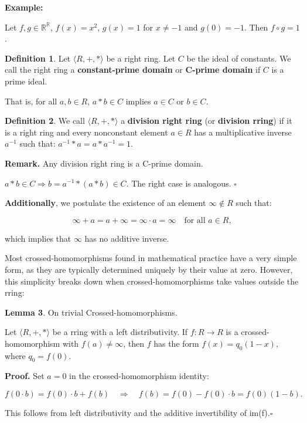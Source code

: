 \documentclass[12pt]{article}
\theoremstyle{definition}
\newtheorem{definition}{Definition}[section]
\newtheorem{lemma}[definition]{Lemma}
\begin{document}
\vspace{10pt}
\noindent\textbf{Example:} 

Let $f, g \in \mathbb{R}^{\mathbb{R}}$, $f(x) = x^2$, $g(x) = 1$ for $x \neq -1$ and $g(0) = -1$. Then $f \circ g = 1$.


\vspace{10pt}
\begin{definition} Let $\langle R, +, * \rangle$ be a right ring. Let $C$ be the ideal of constants. We call the right ring a \textbf{constant-prime domain} or \textbf{C-prime domain} if $C$ is a prime ideal.

That is, for all $a, b \in R$, $a * b \in C$ implies $a \in C$ or $b \in C$.
\end{definition}


\vspace{10pt}
\begin{definition} We call $\langle R, +, * \rangle$ a \textbf{division right ring} (or \textbf{division rring}) if it is a right ring and every nonconstant element $a \in R$ has a multiplicative inverse $a^{-1}$ such that: $a^{-1} * a = a * a^{-1} = 1.$  
\end{definition}

\vspace{10pt}
\noindent\textbf{Remark.} Any division right ring is a C-prime domain.

\vspace{5pt}
 $a * b \in C \Rightarrow b = a^{-1} * (a * b) \in C$. The right case is analogous. $\square$

\vspace{10pt}
\noindent \textbf{Additionally}, we postulate the existence of an element $\infty \notin R$ such that:

\[
\infty + a = a + \infty = \infty \cdot a = \infty \quad \text{for all } a \in R,
\]

which implies that $\infty$ has no additive inverse.

\newpage
\noindent Most crossed-homomorphisms found in mathematical practice have a very simple form, as they are typically determined uniquely by their value at zero. However, this simplicity breaks down when crossed-homomorphisms take values outside the rring:


\vspace{10pt}
\begin{lemma} On trivial Crossed-homomorphisms.  

\vspace{10pt}
\noindent Let $\langle R, +, * \rangle$ be a rring with a left distributivity. If $f: R \to R$ is a crossed-homomorphism with $f(a) \neq \infty$, then $f$ has the form $f(x) = q_0(1 - x)$, where $q_0 = f(0)$.

\vspace{5pt}
\noindent\textbf{Proof.} Set $a = 0$ in the crossed-homomorphism identity:

\[
f(0 \cdot b) = f(0) \cdot b + f(b) \quad \Rightarrow \quad f(b) = f(0) - f(0) \cdot b = f(0)(1 - b). \quad 
\]

\vspace{5pt}
This follows from left distributivity and the additive invertibility of im(f).$\square$
\end{lemma}
\end{document}
